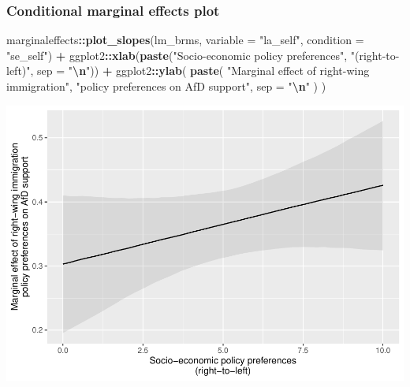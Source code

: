 \documentclass[
  11pt,
]{article}
\newenvironment{Shaded}{\begin{snugshade}}{\end{snugshade}}
\newcommand{\AttributeTok}[1]{\textcolor[rgb]{0.13,0.29,0.53}{#1}}
\newcommand{\FunctionTok}[1]{\textcolor[rgb]{0.13,0.29,0.53}{\textbf{#1}}}
\newcommand{\NormalTok}[1]{#1}
\newcommand{\SpecialCharTok}[1]{\textcolor[rgb]{0.81,0.36,0.00}{\textbf{#1}}}
\newcommand{\StringTok}[1]{\textcolor[rgb]{0.31,0.60,0.02}{#1}}
\begin{document}
\hypertarget{conditional-marginal-effects-plot}{%
\subsubsection{Conditional marginal effects plot}\label{conditional-marginal-effects-plot}}

\begin{Shaded}
\begin{Highlighting}[]
\NormalTok{marginaleffects}\SpecialCharTok{::}\FunctionTok{plot\_slopes}\NormalTok{(lm\_brms,}
                             \AttributeTok{variable =} \StringTok{"la\_self"}\NormalTok{,}
                             \AttributeTok{condition =} \StringTok{"se\_self"}\NormalTok{) }\SpecialCharTok{+}
\NormalTok{  ggplot2}\SpecialCharTok{::}\FunctionTok{xlab}\NormalTok{(}\FunctionTok{paste}\NormalTok{(}\StringTok{"Socio{-}economic policy preferences"}\NormalTok{,}
                      \StringTok{"(right{-}to{-}left)"}\NormalTok{,}
                      \AttributeTok{sep =} \StringTok{"}\SpecialCharTok{\textbackslash{}n}\StringTok{"}\NormalTok{)) }\SpecialCharTok{+}
\NormalTok{  ggplot2}\SpecialCharTok{::}\FunctionTok{ylab}\NormalTok{(}
    \FunctionTok{paste}\NormalTok{(}
      \StringTok{"Marginal effect of right{-}wing immigration"}\NormalTok{,}
      \StringTok{"policy preferences on AfD support"}\NormalTok{,}
      \AttributeTok{sep =} \StringTok{"}\SpecialCharTok{\textbackslash{}n}\StringTok{"}
\NormalTok{    )}
\NormalTok{  )}
\end{Highlighting}
\end{Shaded}

\includegraphics{02-02-lec_files/figure-latex/mfx-la-1.pdf}
\end{document}
